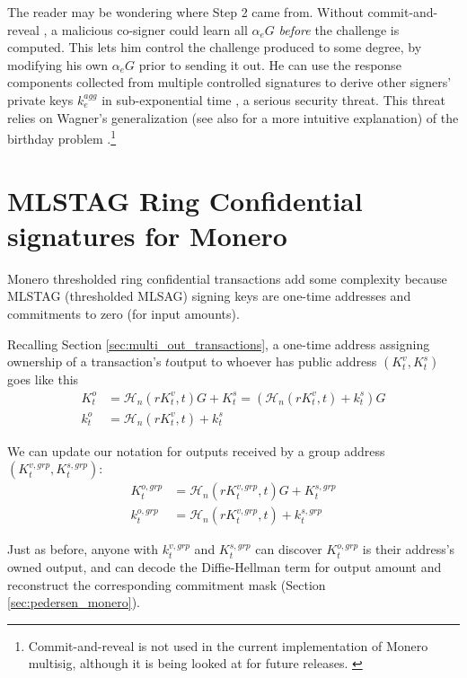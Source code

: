 The reader may be wondering where Step 2 came from. Without commit-and-reveal \cite{MRL-0009-multisig}, a malicious co-signer could learn all $\alpha_e G$ {\em before} the challenge is computed. This lets him control the challenge produced to some degree, by modifying his own $\alpha_e G$ prior to sending it out. He can use the response components collected from multiple controlled signatures to derive other signers' private keys $k^{agg}_e$ in sub-exponential time \cite{cryptoeprint:2018:417}, a serious security threat. This threat relies on Wagner's generalization \cite{generalized-birthday-wagner} (see also \cite{adam-wagnerian-tragedies} for a more intuitive explanation) of the birthday problem \cite{birthday-problem}.\footnote{Commit-and-reveal is not used in the current implementation of Monero multisig, although it is being looked at for future releases. \cite{multisig-research-issue-67}}



\section{MLSTAG Ring Confidential signatures for Monero}
\label{sec:MLSTAG-RingCT}

Monero thresholded ring confidential transactions add some complexity because MLSTAG (thresholded MLSAG) signing keys are one-time addresses and commitments to zero (for input amounts).

Recalling Section \ref{sec:multi_out_transactions}, a one-time address assigning ownership of a transaction's $t$\nth output to whoever has public address $(K^v_t,K^s_t)$ goes like this\vspace{.175cm}
\begin{align*}
  K_t^o &= \mathcal{H}_n(r K_t^v, t)G + K_t^s = (\mathcal{H}_n(r K_t^v, t) + k_t^s)G  \\ 
  k_t^o &= \mathcal{H}_n(r K_t^v, t) + k_t^s
\end{align*} 

We can update our notation for outputs received by a group address $(K^{v,grp}_t,K^{s,grp}_t)$:\vspace{.175cm}
\begin{align*}
  K^{o,grp}_t &= \mathcal{H}_n(r K^{v,grp}_t, t)G + K^{s,grp}_t  \\ 
  k^{o,grp}_t &= \mathcal{H}_n(r K^{v,grp}_t, t) + k^{s,grp}_t
\end{align*}

Just as before, anyone with $k^{v,grp}_t$ and $K^{s,grp}_t$ can discover $K^{o,grp}_t$ is their address's owned output, and can decode the Diffie-Hellman term for output amount and reconstruct the corresponding commitment mask (Section \ref{sec:pedersen_monero}). 

